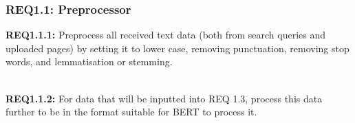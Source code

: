 \subsubsection{REQ1.1: Preprocessor}

\textbf{REQ1.1.1: }Preprocess all received text data (both from search queries and uploaded pages) by setting it to lower case, removing punctuation, removing stop words, and lemmatisation or stemming.\par
\textbf{\\REQ1.1.2: }For data that will be inputted into REQ 1.3, process this data further to be in the format suitable for BERT to process it.\par
